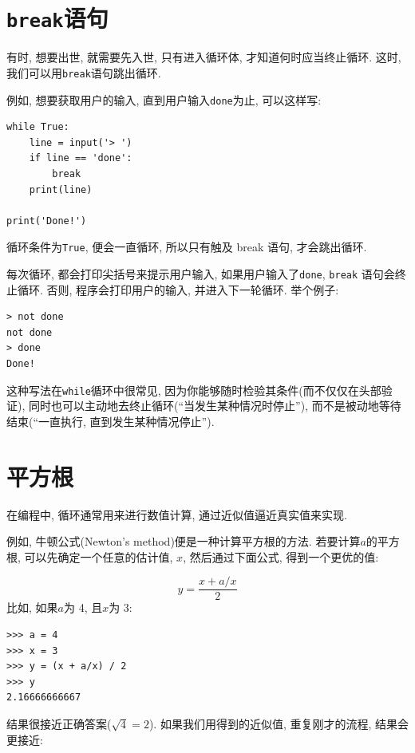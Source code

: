 \documentclass[10pt]{book}
\begin{document}
\section{{\tt break}语句}
有时, 想要出世, 就需要先入世, 只有进入循环体, 
才知道何时应当终止循环. 
这时, 我们可以用{\tt break}语句跳出循环. 

例如, 想要获取用户的输入, 直到用户输入{\tt done}为止, 可以这样写:

\begin{verbatim}
while True:
    line = input('> ')
    if line == 'done':
        break
    print(line)

print('Done!')
\end{verbatim}
%
循环条件为{\tt True}, 便会一直循环, 所以只有触及 break 语句, 才会跳出循环. 

每次循环, 都会打印尖括号来提示用户输入, 
如果用户输入了{\tt done}, {\tt break} 语句会终止循环. 
否则, 程序会打印用户的输入, 并进入下一轮循环. 
举个例子:

\begin{verbatim}
> not done
not done
> done
Done!
\end{verbatim}
%
这种写法在{\tt while}循环中很常见, 
因为你能够随时检验其条件(而不仅仅在头部验证), 
同时也可以主动地去终止循环(``当发生某种情况时停止''), 
而不是被动地等待结束(``一直执行, 直到发生某种情况停止'').


\section{平方根}
\label{squareroot}

在编程中, 循环通常用来进行数值计算, 通过近似值逼近真实值来实现. 

例如, 牛顿公式(Newton's method)便是一种计算平方根的方法. 
若要计算$a$的平方根, 可以先确定一个任意的估计值, $x$, 
然后通过下面公式, 得到一个更优的值:

\[ y = \frac{x + a/x}{2} \]
%
比如, 如果$a$为 4, 且$x$为 3:

\begin{verbatim}
>>> a = 4
>>> x = 3
>>> y = (x + a/x) / 2
>>> y
2.16666666667
\end{verbatim}
%
结果很接近正确答案($\sqrt{4} = 2$).
如果我们用得到的近似值, 重复刚才的流程, 结果会更接近:
\end{document}
